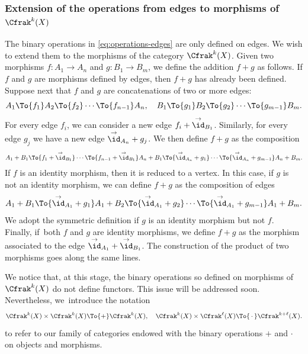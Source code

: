 \subsubsection*{Extension of the operations from edges to morphisms of $\Cfrak^{k}(X)$} The binary operations in \eqref{eq:operations-edges} are only defined on edges. We wish to extend them to the morphisms of the category $\Cfrak^{k}(X)$. Given two morphisms $f\colon A_{1}\to A_{n}$ and $g\colon B_{1}\to B_{m}$, we define the addition $f + g$ as follows. If $f$ and $g$ are morphisms defined by edges, then $f+g$ has already been defined. Suppose next that $f$ and $g$ are concatenations of two or more edges:
\begin{displaymath}
A_{1}\To{f_{1}} A_{2}\To{f_{2}}\cdots\To{f_{n-1}} A_{n},\quad B_{1}\To{g_{1}}B_{2}\To{g_{2}}\cdots\To{g_{m-1}} B_{m}.
\end{displaymath}
For every edge $f_{i}$, we can consider a new edge $f_{i}+\overset{\to}{\id}_{B_{1}}$. Similarly, for every edge $g_{j}$ we have a new edge $\overset{\to}{\id}_{A_{n}}+g_{j}$. We then define $f+ g$ as the composition
\begin{displaymath}
\begin{split}
A_{1}+B_{1}\To{f_{1}+\overset{\to}{\id}_{B_{1}}} \cdots\To{f_{n-1}+\overset{\to}{\id}_{B_{1}}} A_{n}+B_{1}\To{\overset{\to}{\id}_{A_{n}}+g_{1}}\cdots\To{\overset{\to}{\id}_{A_{n}}+g_{m-1}} A_{n}+B_{m}.
\end{split}
\end{displaymath}
If $f$ is an identity morphism, then it is reduced to a vertex. In this case, if $g$ is not an identity morphism, we can define $f+ g$ as the composition of edges
\begin{displaymath}
A_{1}+B_{1}\To{\overset{\to}{\id}_{A_{1}}+g_{1}}A_{1}+B_{2}\To{\overset{\to}{\id}_{A_{1}}+g_{2}}\cdots\To{\overset{\to}{\id}_{A_{1}}+g_{m-1}}A_{1}+B_{m}.
\end{displaymath}
We adopt the symmetric definition if $g$ is an identity morphism but not $f$. Finally, if~both $f$ and $g$ are identity morphisms, we define $f+ g$ as the morphism associated to the edge $\overset{\to}{\id}_{A_{1}}+\overset{\to}{\id}_{B_{1}}$. The construction of the product of two morphisms goes along the same lines.

We notice that, at this stage, the binary operations so defined on morphisms of $\Cfrak^{k}(X)$ do not define functors. This issue will be addressed soon. Nevertheless, we~introduce the notation
\begin{equation}\label{eq:binary-operations-on-Ck}
\Cfrak^{k}(X)\times\Cfrak^{k}(X)\To{+}\Cfrak^{k}(X),\quad \Cfrak^{k}(X)\times\Cfrak^{\ell}(X)\To{\,\cdot\,}\Cfrak^{k+\ell}(X).
\end{equation}
to refer to our family of categories endowed with the binary operations $+$ and $\cdot$ on objects and morphisms.

